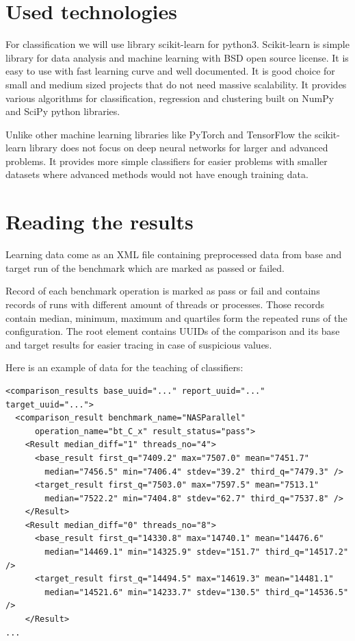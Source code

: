 \section{Used technologies}
For classification we will use library scikit-learn for python3. Scikit-learn is
simple library for data analysis and machine learning with BSD open source
license. It is easy to use with fast learning curve and well documented. It is
good choice for small and medium sized projects that do not need massive
scalability. It provides various algorithms for classification, regression and
clustering built on NumPy and SciPy python libraries.

Unlike other machine learning libraries like PyTorch and TensorFlow the
scikit-learn library does not focus on deep neural networks for larger and
advanced problems. It provides more simple classifiers for easier problems
with smaller datasets where advanced methods would not have enough training
data.

\section{Reading the results}
Learning data come as an XML file containing preprocessed data from
base and target run of the benchmark which are marked as passed or failed.

Record of each benchmark operation is marked as pass or fail and contains
records of runs with different amount of threads or processes. Those records
contain median, minimum, maximum and quartiles form the repeated runs of the
configuration. The root element contains UUIDs of the comparison and its base
and target results for easier tracing in case of suspicious values.

Here is an example of data for the teaching of classifiers:
\begin{verbatim}
<comparison_results base_uuid="..." report_uuid="..." target_uuid="...">
  <comparison_result benchmark_name="NASParallel"
      operation_name="bt_C_x" result_status="pass">
    <Result median_diff="1" threads_no="4">
      <base_result first_q="7409.2" max="7507.0" mean="7451.7"
        median="7456.5" min="7406.4" stdev="39.2" third_q="7479.3" />
      <target_result first_q="7503.0" max="7597.5" mean="7513.1"
        median="7522.2" min="7404.8" stdev="62.7" third_q="7537.8" />
    </Result>
    <Result median_diff="0" threads_no="8">
      <base_result first_q="14330.8" max="14740.1" mean="14476.6"
        median="14469.1" min="14325.9" stdev="151.7" third_q="14517.2" />
      <target_result first_q="14494.5" max="14619.3" mean="14481.1"
        median="14521.6" min="14233.7" stdev="130.5" third_q="14536.5" />
    </Result>
...
\end{verbatim}

